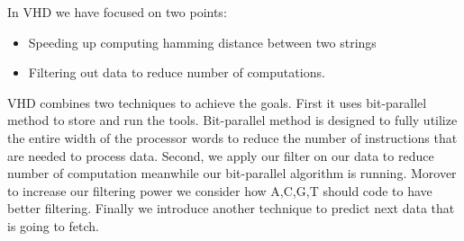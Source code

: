 In VHD we have focused on two points:
\begin{itemize}
\item Speeding up computing hamming distance between two strings
\item Filtering out data to reduce number of computations.
\end{itemize}
  
 VHD combines two techniques to achieve the goals. First it uses bit-parallel method to store and run the tools. Bit-parallel method is designed to fully utilize the entire width of the processor words to reduce the number of instructions that are needed to process data. Second, we apply  our filter on our data to reduce number of computation meanwhile our bit-parallel algorithm is running. Morover to increase our filtering power we consider how A,C,G,T should code to have better filtering. Finally we introduce another technique to predict next data that is going to fetch.
 